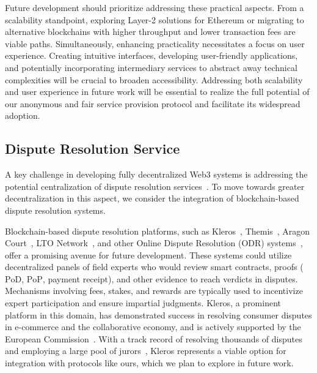 \documentclass[pdftex,twocolumn,epjc3]{svjour3}
\begin{document}
\begin{sloppypar}
Future development should prioritize addressing these practical aspects.  From a scalability standpoint, exploring Layer-2 solutions for Ethereum or migrating to alternative blockchains with higher throughput and lower transaction fees are viable paths.  Simultaneously, enhancing practicality necessitates a focus on user experience.  Creating intuitive interfaces, developing user-friendly applications, and potentially incorporating intermediary services to abstract away technical complexities will be crucial to broaden accessibility.  Addressing both scalability and user experience in future work will be essential to realize the full potential of our anonymous and fair service provision protocol and facilitate its widespread adoption.
\end{sloppypar}

\subsection{Dispute Resolution Service}\label{sec:decentralised-justice}

\begin{sloppypar}
A key challenge in developing fully decentralized Web3 systems is addressing the potential centralization of dispute resolution services~\cite{ethereumWhatWeb3Why2023}. To move towards greater decentralization in this aspect, we consider the integration of blockchain-based dispute resolution systems.
\end{sloppypar}

\begin{sloppypar}
Blockchain-based dispute resolution platforms, such as Kleros~\cite{bergollaKlerosSociolegalCase2022, nappertDecentralizedJusticeReinventing2020, gudkovCrowdArbitrationBlockchain2020}, Themis~\cite{mengThemisDecentralizedEscrow2019}, Aragon Court~\cite{AragonWhitepaper2023,aragonDecentralizedDisputeResolution}, LTO Network~\cite{ltonetworkNextGenBlockchainB2B}, and other Online Dispute Resolution (ODR) systems~\cite{allenGovernanceBlockchainDispute2019, lingwallShouldCodeBe2019}, offer a promising avenue for future development. These systems could utilize decentralized panels of field experts who would review smart contracts, proofs ($\mathrm{PoD}$, $\mathrm{PoP}$, payment $\mathrm{receipt}$), and other evidence to reach verdicts in disputes. Mechanisms involving fees, stakes, and rewards are typically used to incentivize expert participation and ensure impartial judgments. Kleros, a prominent platform in this domain, has demonstrated success in resolving consumer disputes in e-commerce and the collaborative economy, and is actively supported by the European Commission~\cite{europeancommissionCommissionEuropeanInnovation2020}. With a track record of resolving thousands of disputes and employing a large pool of jurors~\cite{KlerosHomepage}, Kleros represents a viable option for integration with protocols like ours, which we plan to explore in future work.
\end{sloppypar}
\end{document}
